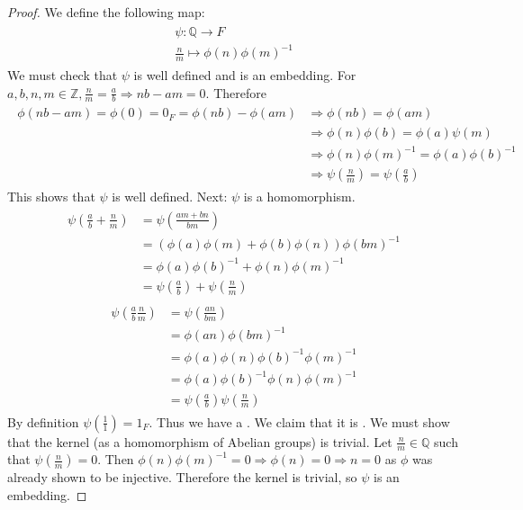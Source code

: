 \documentclass{article}
\begin{document}
\begin{proof}
We define the following map:
\begin{align*}
\begin{gathered}
\psi: \mathbb{Q} \rightarrow F \\
\frac{n}{m} \mapsto \phi(n) \phi(m)^{-1}
\end{gathered}
\end{align*}
We must check that $\psi$ is well defined and is an embedding.
For $a, b, n, m \in \mathbb{Z}, \frac{n}{m}=\frac{a}{b} \Rightarrow n b-a m=0$. Therefore
\begin{align*}
\begin{aligned}
\phi(n b-a m)=\phi(0)=0_{F}=\phi(n b)-\phi(a m) & \Rightarrow \phi(n b)=\phi(a m) \\
& \Rightarrow \phi(n) \phi(b)=\phi(a)\psi(m) \\
& \Rightarrow \phi(n) \phi(m)^{-1}=\phi(a) \phi(b)^{-1} \\
& \Rightarrow \psi\left(\frac{n}{m}\right)=\psi\left(\frac{a}{b}\right)
\end{aligned}
\end{align*}
This shows that $\psi$ is well defined.
Next: $\psi$ is a homomorphism.
\begin{align*}
\begin{aligned}
\psi\left(\frac{a}{b}+\frac{n}{m}\right) &=\psi\left(\frac{a m+b n}{b m}\right) \\
&=(\phi(a) \phi(m)+\phi(b) \phi(n)) \phi(b m)^{-1} \\
&=\phi(a) \phi(b)^{-1}+\phi(n) \phi(m)^{-1} \\
&=\psi\left(\frac{a}{b}\right)+\psi\left(\frac{n}{m}\right)
\end{aligned}
\end{align*}
\begin{align*}
\begin{aligned}
\psi\left(\frac{a}{b} \frac{n}{m}\right) &=\psi\left(\frac{a n}{b m}\right) \\
&=\phi(a n) \phi(b m)^{-1} \\
&=\phi(a) \phi(n) \phi(b)^{-1} \phi(m)^{-1} \\
&=\phi(a) \phi(b)^{-1} \phi(n) \phi(m)^{-1} \\
&=\psi\left(\frac{a}{b}\right) \psi\left(\frac{n}{m}\right)
\end{aligned}
\end{align*}
By definition $\psi\left(\frac{1}{1}\right)=1_{F}$. Thus we have a . We claim that it is . We must show that the kernel (as a homomorphism of Abelian groups) is trivial. Let $\frac{n}{m} \in \mathbb{Q}$ such that $\psi\left(\frac{n}{m}\right)=0$. Then $\phi(n) \phi(m)^{-1}=0 \Rightarrow \phi(n)=0 \Rightarrow n=0$ as $\phi$ was already shown to be injective. Therefore the kernel is trivial, so $\psi$ is an embedding.
\end{proof}
\end{document}
